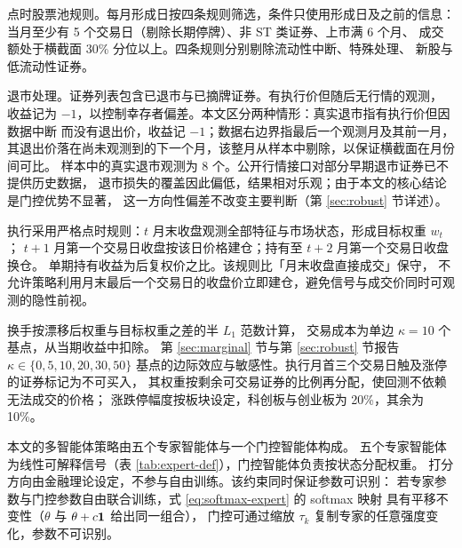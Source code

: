 点时股票池规则。每月形成日按四条规则筛选，条件只使用形成日及之前的信息：
当月至少有 5 个交易日（剔除长期停牌）、非 ST 类证券、上市满 6 个月、
成交额处于横截面 30\% 分位以上。四条规则分别剔除流动性中断、特殊处理、
新股与低流动性证券。

退市处理。证券列表包含已退市与已摘牌证券。有执行价但随后无行情的观测，
收益记为 $-1$，以控制幸存者偏差。本文区分两种情形：真实退市指有执行价但因数据中断
而没有退出价，收益记 $-1$；数据右边界指最后一个观测月及其前一月，
其退出价落在尚未观测到的下一个月，该整月从样本中剔除，以保证横截面在月份间可比。
样本中的真实退市观测为 8 个。公开行情接口对部分早期退市证券已不提供历史数据，
退市损失的覆盖因此偏低，结果相对乐观；由于本文的核心结论是门控优势不显著，
这一方向性偏差不改变主要判断（第 \ref{sec:robust} 节详述）。

执行采用严格点时规则：$t$ 月末收盘观测全部特征与市场状态，形成目标权重 $w_t$；
$t+1$ 月第一个交易日收盘按该日价格建仓；持有至 $t+2$ 月第一个交易日收盘换仓。
单期持有收益为后复权价之比。该规则比「月末收盘直接成交」保守，
不允许策略利用月末最后一个交易日的收盘价立即建仓，避免信号与成交价同时可观测的隐性前视。

换手按漂移后权重与目标权重之差的半 $L_1$ 范数计算，
交易成本为单边 $\kappa=10$ 个基点，从当期收益中扣除。
第 \ref{sec:marginal} 节与第 \ref{sec:robust} 节报告 $\kappa\in\{0,5,10,20,30,50\}$
基点的边际效应与敏感性。执行月首三个交易日触及涨停的证券标记为不可买入，
其权重按剩余可交易证券的比例再分配，使回测不依赖无法成交的价格；
涨跌停幅度按板块设定，科创板与创业板为 20\%，其余为 10\%。

本文的多智能体策略由五个专家智能体与一个门控智能体构成。
五个专家智能体为线性可解释信号（表 \ref{tab:expert-def}），门控智能体负责按状态分配权重。
打分方向由金融理论设定，不参与自由训练。该约束同时保证参数可识别：
若专家参数与门控参数自由联合训练，式 \eqref{eq:softmax-expert} 的 softmax 映射
具有平移不变性（$\theta$ 与 $\theta+c\mathbf{1}$ 给出同一组合），
门控可通过缩放 $\tau_k$ 复制专家的任意强度变化，参数不可识别。

